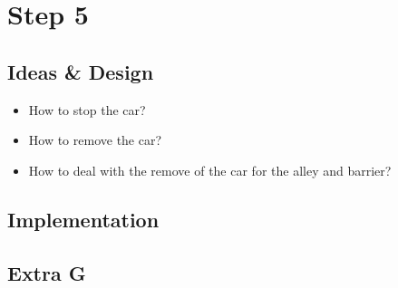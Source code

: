\section{Step 5}


\subsection{Ideas \& Design}

\begin{itemize}
\item How to stop the car?
\item How to remove the car?
\item How to deal with the remove of the car for the alley and barrier?
\end{itemize}

\subsection{Implementation}


\subsection{Extra G}
